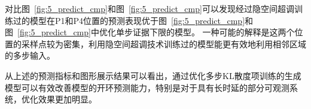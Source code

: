 对比图~\ref{fig:5_predict_cmp}和图~\ref{fig:5_predict_cmp}可以发现经过隐空间超调训练过的模型在P1和P4位置的预测表现优于图~\ref{fig:5_predict_cmp}和图~\ref{fig:5_predict_cmp}中优化单步证据下限的模型。
一种可能的解释是这两个位置的采样点较为密集，利用隐空间超调技术训练过的模型能更有效地利用相邻区域的多步输入。

从上述的预测指标和图形展示结果可以看出，通过优化多步KL散度项训练的生成模型可以有效改善模型的开环预测能力，特别是对于具有长时延的部分可观测系统，优化效果更加明显。


